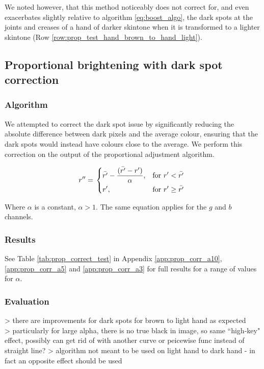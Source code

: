 \documentclass[12pt, a4paper]{article}
\newcommand*\mean[1]{\bar{#1}}
\begin{document}
We noted however, that this method noticeably does not correct for, and even exacerbates slightly relative to algorithm \ref{eq:boost_algo}, the dark spots at the joints and creases of a hand of darker skintone when it is transformed to a lighter skintone (Row \ref{row:prop_test_hand_brown_to_hand_light}).

\subsection{Proportional brightening with dark spot correction}

\subsubsection{Algorithm}
We attempted to correct the dark spot issue by significantly reducing the absolute difference between dark pixels and the average colour, ensuring that the dark spots would instead have colours close to the average. We perform this correction on the output of the proportional adjustment algorithm.

\begin{equation} \label{eq:prop_algo}
  r'' = \left.
  \begin{dcases}
    \displaystyle \mean{r'} - \frac{(\mean{r'} - r')}{\alpha}, & \text{for } r' < \mean{r'} \\
    \displaystyle r', & \text{for } r' \geq \mean{r'} \\
  \end{dcases}
  \right.\\
\end{equation}

Where $\alpha$ is a constant, $\alpha  > 1$. The same equation applies for the $g$ and $b$ channels.

\subsubsection{Results}
See Table \ref{tab:prop_correct_test} in Appendix \ref{app:prop_corr_a10}, \ref{app:prop_corr_a5} and \ref{app:prop_corr_a3} for full results for a range of values for $\alpha$. %

\subsubsection{Evaluation}
> there are improvements for dark spots for brown to light hand as expected\\
> particularly for large alpha, there is no true black in image, so same ``high-key" effect, possibly can get rid of with another curve or peicewise func instead of straight line?
> algorithm not meant to be used on light hand to dark hand - in fact an opposite effect should be used
\end{document}
